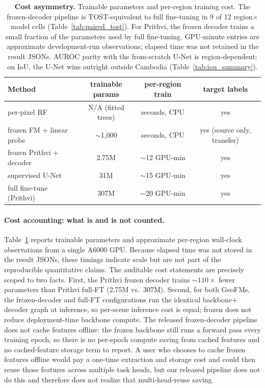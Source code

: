 \documentclass{article}
\newcommand{\tablebodygap}{\vspace{0.45em}}
\begin{document}
\begin{table}[!htb]
\centering\small
\caption{\textbf{Cost asymmetry.} Trainable parameters and per-region training cost.
The frozen-decoder pipeline is TOST-equivalent to full fine-tuning in 9 of 12
region$\times$model cells (Table~\ref{tab:paired_tost}). For Prithvi, the frozen
decoder trains a small fraction of the parameters used by full fine-tuning. GPU-minute entries are approximate development-run
observations; elapsed time was not retained in the result JSONs. AUROC
parity with the from-scratch U-Net is region-dependent; on IoU, the U-Net wins
outright outside Cambodia (Table~\ref{tab:iou_summary}).}
\label{tab:cost}
\tablebodygap
\begin{tabular}{lccc}
\toprule
Method & trainable params & per-region train & target labels \\
\midrule
per-pixel RF              & N/A (fitted trees) & seconds, CPU & yes \\
frozen FM + linear probe  & $\sim$1{,}000      & seconds, CPU & yes (source only, transfer) \\
frozen Prithvi + decoder  & 2.75M              & $\sim$12 GPU-min & yes \\
supervised U-Net          & 31M                & $\sim$15 GPU-min & yes \\
full fine-tune (Prithvi)  & 307M               & $\sim$20 GPU-min & yes \\
\bottomrule
\end{tabular}
\end{table}

\paragraph{Cost accounting: what is and is not counted.} Table~\ref{tab:cost} reports
trainable parameters and approximate per-region wall-clock observations from a
single A6000 GPU. Because elapsed time was not stored in the result JSONs, these
timings indicate scale but are not part of the reproducible quantitative claims.
The auditable cost statements are precisely scoped to two facts. First, the Prithvi
frozen decoder trains ${\sim}110\times$ fewer parameters than Prithvi full-FT
(2.75M vs.\ 307M). Second, for both GeoFMs, the frozen-decoder and full-FT
configurations run the identical backbone$+$decoder graph at inference,
so per-scene inference cost is equal; frozen does not reduce deployment-time backbone
compute. The released frozen-decoder pipeline does not cache features offline: the
frozen backbone still runs a forward pass every training epoch, so there is no
per-epoch compute saving from cached features and no cached-feature storage term to
report. A user who chooses to cache frozen features offline would pay a one-time
extraction and storage cost and could then reuse those features across multiple task
heads, but our released pipeline does not do this and therefore does not realize that
multi-head-reuse saving.
\end{document}
